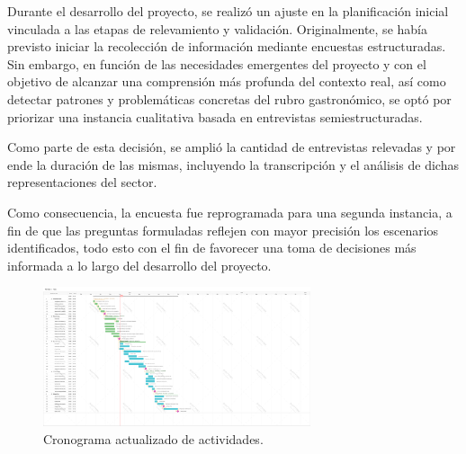 
Durante el desarrollo del proyecto, se realizó un ajuste en la planificación inicial vinculada a las etapas de relevamiento y validación. Originalmente, se había previsto iniciar la recolección de información mediante encuestas estructuradas. Sin embargo, en función de las necesidades emergentes del proyecto y con el objetivo de alcanzar una comprensión más profunda del contexto real, así como detectar patrones y problemáticas concretas del rubro gastronómico, se optó por priorizar una instancia cualitativa basada en entrevistas semiestructuradas. 

Como parte de esta decisión, se amplió la cantidad de entrevistas relevadas y por ende la duración de las mismas, incluyendo la transcripción y el análisis de dichas representaciones del sector.

Como consecuencia, la encuesta fue reprogramada para una segunda instancia, a fin de que las preguntas formuladas reflejen con mayor precisión los escenarios identificados, todo esto con el fin de favorecer una toma de decisiones más informada a lo largo del desarrollo del proyecto.

\begin{figure}[ht]
    \centering
    \includegraphics[width=0.7\textwidth]{images/cronograma.png}
    \caption{Cronograma actualizado de actividades.}
    \label{fig:cronograma}
\end{figure}
